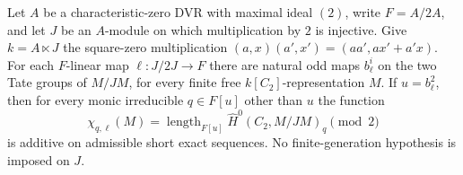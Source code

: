 \begin{lemma}
\label{C:linear_nil_Bockstein}
Let $A$ be a characteristic-zero DVR with maximal ideal $(2)$,
write $F=A/2A$, and let $J$ be an $A$-module on which multiplication
by $2$ is injective. Give $k=A\ltimes J$ the square-zero multiplication
$(a,x)(a',x')=(aa',ax'+a'x)$.
For each $F$-linear map $\ell:J/2J\to F$ there are natural odd maps
$b_\ell^i$ on the two Tate groups of $M/JM$, for every finite free
$k[C_2]$-representation $M$. If $u=b_\ell^2$, then for every monic
irreducible $q\in F[u]$ other than $u$ the function
\[
 \chi_{q,\ell}(M)=
 \operatorname{length}_{F[u]}
       \widehat H^0(C_2,M/JM)_q\pmod2                 \tag{C.1.25}
\]
is additive on admissible short exact sequences.
No finite-generation hypothesis is imposed on $J$.
\end{lemma}
